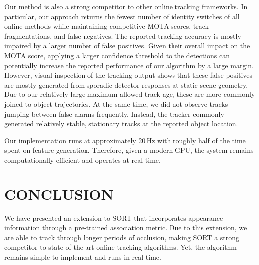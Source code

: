 \documentclass{article}
\begin{document}
Our method is also a strong competitor to other online tracking frameworks.
In particular, our approach returns the fewest number of identity switches of
all online methods while maintaining competitive MOTA scores, track
fragmentations, and false negatives.
The reported tracking accuracy is mostly impaired by a larger number of false
positives.
Given their overall impact on the MOTA score, applying a larger confidence
threshold to the detections can potentially increase the reported performance
of our algorithm by a large margin.
However, visual inspection of the tracking output shows that these false
positives are mostly generated from sporadic detector responses at static scene
geometry.
Due to our relatively large
maximum allowed track age, these are more commonly joined to object
trajectories. At the same time, we did not observe tracks jumping between
false alarms frequently. Instead, the tracker commonly generated relatively
stable, stationary tracks at the reported object location.



Our implementation runs at approximately 20\,Hz with roughly half of the time
spent on feature generation.
Therefore, given a modern GPU, the system remains computationally efficient
and operates at real time.

\section{CONCLUSION}
\label{sec:conclusion}

We have presented an extension to SORT that incorporates appearance information
through a pre-trained association metric.
Due to this extension, we are able to track through longer periods of
occlusion, making SORT a strong competitor to state-of-the-art online
tracking algorithms. Yet, the algorithm remains simple to implement and
runs in real time.

\clearpage




\newpage
\end{document}
